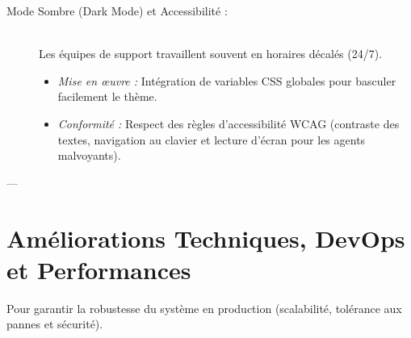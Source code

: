 \documentclass[12pt,a4paper]{article}
\begin{document}
\begin{description}
    \item[Mode Sombre (Dark Mode) et Accessibilité :] \hfill \\
    Les équipes de support travaillent souvent en horaires décalés (24/7).
    \begin{itemize}
        \item \textit{Mise en œuvre :} Intégration de variables CSS globales pour basculer facilement le thème.
        \item \textit{Conformité :} Respect des règles d'accessibilité WCAG (contraste des textes, navigation au clavier et lecture d'écran pour les agents malvoyants).
    \end{itemize}
\end{description}

---

\section{Améliorations Techniques, DevOps et Performances}
Pour garantir la robustesse du système en production (scalabilité, tolérance aux pannes et sécurité).
\end{document}

